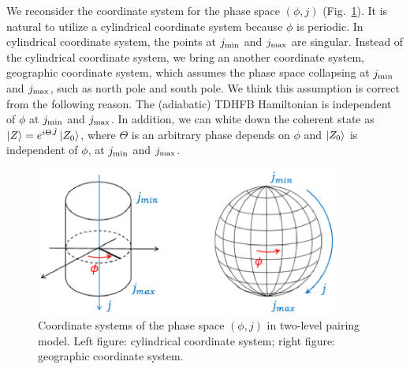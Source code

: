 \documentclass[11pt]{book} %
\begin{document}
We reconsider the coordinate system for the phase space $(\phi,j)$ (Fig.~\ref{coordinate}). It is natural to utilize 
a cylindrical coordinate system because $\phi$ is periodic. In cylindrical coordinate system, the points at $j_{\rm min}$ and $j_{\rm max}$ are singular. Instead of the cylindrical coordinate system, we bring an another coordinate system, geographic coordinate system, which assumes the phase space collapsing at $j_{\rm min}$ and  $j_{\rm max}$, such as north pole and south pole. We think this assumption is correct from the following reason. The (adiabatic) TDHFB Hamiltonian is independent of $\phi$ at $j_{\rm min}$ and $j_{\rm max}$. In addition, we can white down the coherent state as $\ket{Z}=e^{i\Theta \hat{J}}\ket{Z_0}$, where $\Theta$ is an arbitrary phase depends on $\phi$ and $\ket{Z_0}$ is independent of $\phi$, at $j_{\rm min}$ and $j_{\rm max}$. 

\begin{figure}[htbp]
 \begin{center}
  \includegraphics[width=100mm]{images/can-trans.eps}
 \end{center}
 \caption{Coordinate systems of the phase space $(\phi,j)$ in two-level pairing model. Left figure: cylindrical coordinate system; right figure: geographic coordinate system.}
 \label{coordinate}
\end{figure}
\end{document}
